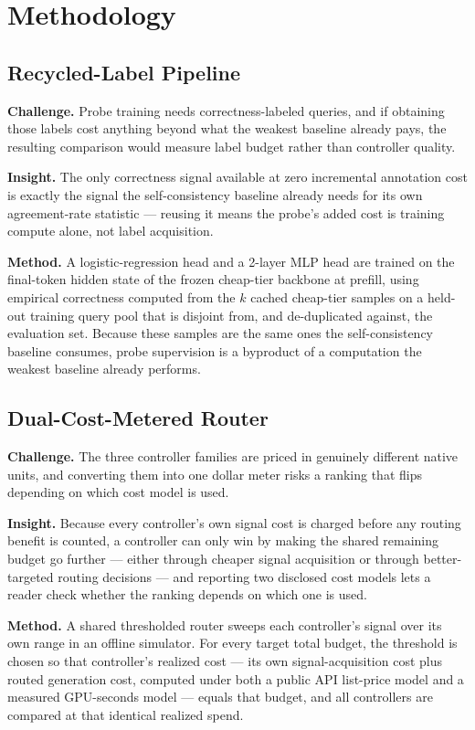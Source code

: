 \documentclass[11pt]{article}
\begin{document}
\section{Methodology}

\subsection{Recycled-Label Pipeline}
\textbf{Challenge.} Probe training needs correctness-labeled queries, and if obtaining those labels cost anything beyond what the weakest baseline already pays, the resulting comparison would measure label budget rather than controller quality.

\textbf{Insight.} The only correctness signal available at zero incremental annotation cost is exactly the signal the self-consistency baseline already needs for its own agreement-rate statistic --- reusing it means the probe's added cost is training compute alone, not label acquisition.

\textbf{Method.} A logistic-regression head and a 2-layer MLP head are trained on the final-token hidden state of the frozen cheap-tier backbone at prefill, using empirical correctness computed from the $k$ cached cheap-tier samples on a held-out training query pool that is disjoint from, and de-duplicated against, the evaluation set. Because these samples are the same ones the self-consistency baseline consumes, probe supervision is a byproduct of a computation the weakest baseline already performs.

\subsection{Dual-Cost-Metered Router}
\textbf{Challenge.} The three controller families are priced in genuinely different native units, and converting them into one dollar meter risks a ranking that flips depending on which cost model is used.

\textbf{Insight.} Because every controller's own signal cost is charged before any routing benefit is counted, a controller can only win by making the shared remaining budget go further --- either through cheaper signal acquisition or through better-targeted routing decisions --- and reporting two disclosed cost models lets a reader check whether the ranking depends on which one is used.

\textbf{Method.} A shared thresholded router sweeps each controller's signal over its own range in an offline simulator. For every target total budget, the threshold is chosen so that controller's realized cost --- its own signal-acquisition cost plus routed generation cost, computed under both a public API list-price model and a measured GPU-seconds model --- equals that budget, and all controllers are compared at that identical realized spend.
\end{document}
